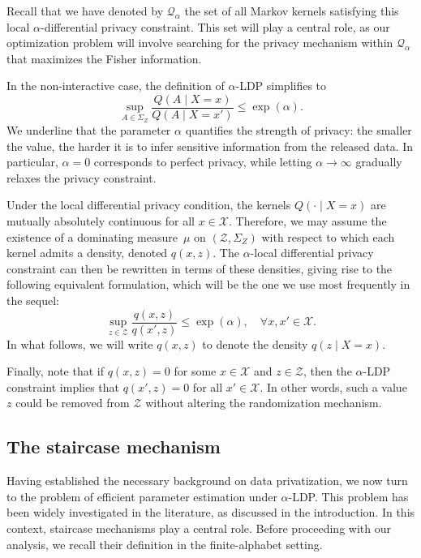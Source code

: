 \documentclass[a4paper, 11pt]{article}
\theoremstyle{definition}
\begin{document}
{Recall that we have denoted by $\mathcal{Q}_\alpha$ the set of all Markov kernels satisfying this local $\alpha$-differential privacy constraint. This set will play a central role, as our optimization problem will involve searching for the privacy mechanism within $\mathcal{Q}_\alpha$ that maximizes the Fisher information.  

In the non-interactive case, the definition of $\alpha$-LDP simplifies to
\[
\sup_{A \in \Sigma_Z} \frac{Q(A \mid X = x)}{Q(A \mid X = x')} \le \exp(\alpha).
\]
We underline that the parameter $\alpha$ quantifies the strength of privacy: the smaller the value, the harder it is to infer sensitive information from the released data. In particular, $\alpha = 0$ corresponds to perfect privacy, while letting $\alpha \to \infty$ gradually relaxes the privacy constraint.  

Under the local differential privacy condition, the kernels $Q(\cdot \mid X = x)$ are mutually absolutely continuous for all $x \in \mathcal{X}$. Therefore, we may assume the existence of a dominating measure~$\mu$ on $(\mathcal{Z}, \Sigma_Z)$ with respect to which each kernel admits a density, denoted $q(x,z)$. The $\alpha$-local differential privacy constraint can then be rewritten in terms of these densities, giving rise to the following equivalent formulation, which will be the one we use most frequently in the sequel:
\begin{equation}\label{eq: def LDP}
\sup_{z \in \mathcal{Z}} \frac{q(x,z)}{q(x',z)} \le \exp(\alpha), \quad \forall x, x' \in \mathcal{X}.
\end{equation}
In what follows, we will write $q(x,z)$ to denote the density $q(z \mid X = x)$.  

Finally, note that if $q(x,z) = 0$ for some $x \in \mathcal{X}$ and $z \in \mathcal{Z}$, then the $\alpha$-LDP constraint implies that $q(x',z) = 0$ for all $x' \in \mathcal{X}$. In other words, such a value $z$ could be removed from $\mathcal{Z}$ without altering the randomization mechanism.


\subsection{The staircase mechanism}

Having established the necessary background on data privatization, we now turn to the problem of efficient parameter estimation under $\alpha$-LDP. This problem has been widely investigated in the literature, as discussed in the introduction. In this context, staircase mechanisms play a central role. Before proceeding with our analysis, we recall their definition in the finite-alphabet setting.  

}
\end{document}

